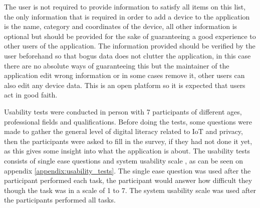 The user is not required to provide information to satisfy all items on this list, the
only information that is required in order to add a device to the application is
the name, category and coordinates of the device, all other
information is optional but should be provided for the sake of guaranteeing a good
experience to other users of the application. The information provided
should be verified by the user beforehand so that bogus data does not clutter
the application, in this case there are no absolute ways of guaranteeing this
but the maintainer of the application edit wrong information or in some
cases remove it, other users can also edit any device data. This is an
open platform so it is expected that users act in good faith.

Usability tests were conducted in person with 7 participants of different
ages, professional fields and qualifications. Before doing the tests,
some questions were made to gather the general level of digital literacy
related to IoT and privacy, then the participants were asked to fill in the
survey, if they had not done it yet, as this gives some insight into what the
application is about. The usability tests consists of single ease questions \cite{tedesco2006comparison}
and system usability scale \cite{brooke1996sus}, as can be seen on appendix \ref{appendix:usability_tests}.
The single ease question was used after the participant performed each task, the
participant would answer how difficult they though the task was in a
scale of 1 to 7. The system usability scale was used after the participants
performed all tasks.





